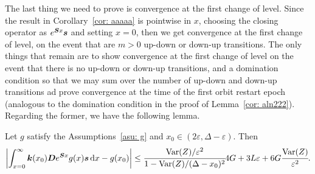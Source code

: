 The last thing we need to prove is convergence at the first change of level. Since the result in Corollary~\ref{cor: aaaaa} is pointwise in \(x\), choosing the closing operator as \(e^{\boldsymbol Sx}\boldsymbol s\) and setting \(x=0\), then we get convergence at the first change of level, on the event that are \(m>0\) up-down or down-up transitions. The only things that remain are to show convergence at the first change of level on the event that there is no up-down or down-up transitions, and a domination condition so that we may sum over the number of up-down and down-up transitions ad prove convergence at the time of the first orbit restart epoch (analogous to the domination condition in the proof of Lemma~\ref{cor: aln222}). Regarding the former, we have the following lemma.

 \begin{lem} \label{lem:tttttt}
 	Let \(g\) satisfy the Assumptions~\ref{asu: g} and \(x_0\in(2\varepsilon,\Delta-\varepsilon)\). Then
 	\begin{align}
 		\left|\int_{x=0}^\infty \boldsymbol k(x_0)\boldsymbol De^{\boldsymbol Sx}g(x)\boldsymbol s\, \mathrm{d} x - g(x_0)\right| \leq \cfrac{\mathrm{Var}(Z)/\varepsilon^2}{1-\mathrm{Var}(Z)/(\Delta-x_0)^2}4G + 3L\varepsilon+6G\cfrac{\mathrm{Var}(Z)}{\varepsilon^2}.
 	\end{align}
 \end{lem}
